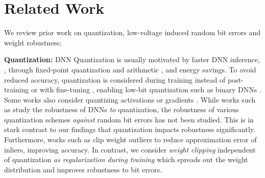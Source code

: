\section{Related Work}
\label{sec:related-work}
 
We review prior work on quantization, low-voltage induced random bit errors and weight robustness; 
 
\textbf{Quantization:} DNN Quantization \citep{GuoARXIV2018b} is usually motivated by faster 
DNN inference, \eg, through fixed-point quantization and arithmetic \citep{ShinICASSP2017,LinICML2016,LiNIPS2017}, and energy savings. To avoid reduced accuracy, quantization is considered during training \citep{JacobCVPR2018,KrishnamoorthiARXIV2018} instead of post-training or with fine-tuning \cite{GoncharenkoARXIV2018,BannerNIPS2019,nvtensorrt,nervana}, enabling low-bit quantization such as binary DNNs \citep{RastegariECCV2016,CourbariauxNIPS2015}. Some works also consider quantizing activations \citep{RastegariECCV2016,ChoiARXIV2018,HubaraJMLR2017} or gradients \citep{SeideINTERSPEECH2014,AlistarhARXIV2016,ZhouARXIV2016}. While works such as \citep{MurthyARXIV2019,MerollaARXIV2016,SungARXIV2015,AlizadehICLR2020} study the robustness of DNNs \emph{to} quantization, the robustness of various quantization schemes \emph{against} random bit errors has not been studied. This is in stark contrast to our findings that quantization impacts robustness significantly. Furthermore, works such as \citep{ZhuangCVPR2018,SungARXIV2015,ParkISCA2018} clip weight outliers to reduce approximation error of inliers, improving accuracy. In contrast, we consider \emph{weight clipping} independent of quantization \emph{as regularization during training} which spreads
out the weight distribution and improves robustness to bit errors.

